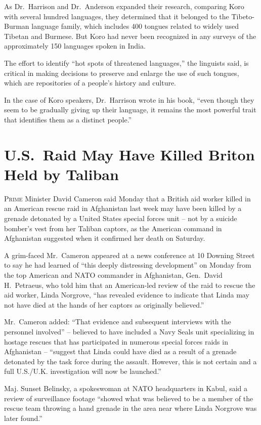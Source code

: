 ﻿\documentclass[12pt]{article}
\begin{document}
As Dr.~Harrison and Dr.~Anderson expanded their research, comparing Koro with several hundred
languages, they determined that it belonged to the Tibeto-Burman language family, which includes 400
tongues related to widely used Tibetan and Burmese. But Koro had never been recognized in any
surveys of the approximately 150 languages spoken in India.

The effort to identify ``hot spots of threatened languages,'' the linguists said, is critical in
making decisions to preserve and enlarge the use of such tongues, which are repositories of a
people's history and culture.

In the case of Koro speakers, Dr.~Harrison wrote in his book, ``even though they seem to be
gradually giving up their language, it remains the most powerful trait that identifies them as a
distinct people.''

\section{U.S.~Raid May Have Killed Briton Held by Taliban}

\lettrine{P}{rime} Minister David Cameron said Monday that a British aid
worker killed in an American rescue raid in Afghanistan last week may have been killed by a grenade
detonated by a United States special forces unit -- not by a suicide bomber's vest from her Taliban
captors, as the American command in Afghanistan suggested when it confirmed her death on Saturday.

A grim-faced Mr.~Cameron appeared at a news conference at 10 Downing Street to say he had learned of
``this deeply distressing development'' on Monday from the top American and NATO commander in
Afghanistan, Gen.~David H.~Petraeus, who told him that an American-led review of the raid to rescue
the aid worker, Linda Norgrove, ``has revealed evidence to indicate that Linda may not have died at
the hands of her captors as originally believed.''

Mr.~Cameron added: ``That evidence and subsequent interviews with the personnel involved'' --
believed to have included a Navy Seals unit specializing in hostage rescues that has participated in
numerous special forces raids in Afghanistan -- ``suggest that Linda could have died as a result of
a grenade detonated by the task force during the assault. However, this is not certain and a full
U.S./U.K. investigation will now be launched.''

Maj. Sunset Belinsky, a spokeswoman at NATO headquarters in Kabul, said a review of surveillance
footage ``showed what was believed to be a member of the rescue team throwing a hand grenade in the
area near where Linda Norgrove was later found.''
\end{document}
